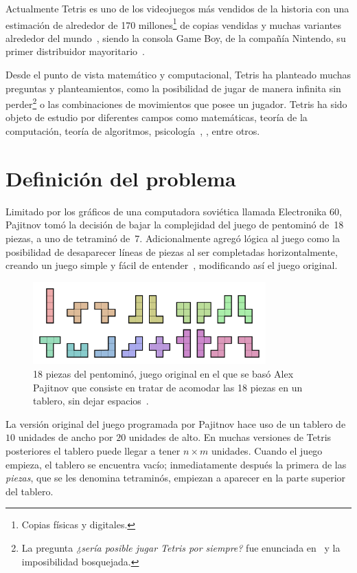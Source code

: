 Actualmente Tetris es uno de los videojuegos más vendidos de la historia con una
estimación de alrededor de 170 millones\footnote{Copias físicas y digitales.} de
copias vendidas y muchas variantes alrededor del mundo~\cite{tetris-numbers},
siendo la consola Game Boy, de la compañía Nintendo, su primer distribuidor
mayoritario~\cite{tetris-25-aniv}.

Desde el punto de vista matemático y computacional, Tetris ha planteado muchas
preguntas y planteamientos, como la posibilidad de jugar de manera infinita sin
perder\footnote{La pregunta \textit{¿sería posible jugar Tetris por siempre?}
fue enunciada en~\cite{Burgiel97howto} y la imposibilidad bosquejada.}
o las combinaciones de movimientos que posee un jugador. Tetris
ha sido objeto de estudio por diferentes campos como matemáticas, teoría de la
computación, teoría de algoritmos, psicología~\cite{Brzustowski_1992},
\cite{Burgiel97howto}, entre otros.

\section{Definición del problema}

Limitado por los gráficos de una computadora soviética llamada Electronika 60,
Pajitnov tomó la decisión de bajar la complejidad del juego de pentominó de~18
piezas, a uno de tetraminó de~7. Adicionalmente agregó lógica al juego como la
posibilidad de desaparecer líneas de piezas al ser completadas horizontalmente,
creando un juego simple y fácil de entender~\cite{tetris-history}, modificando
así el juego original.

\begin{figure}[h]
  \centering
      \includegraphics[width=0.8\textwidth]{./images/pentominoes}
    \caption{18 piezas del pentominó, juego original en el que se basó Alex
    Pajitnov que consiste en tratar de acomodar las 18 piezas en un
    tablero, sin dejar espacios~\cite{WikipediaEN:pentomino}.}
    \label{fig:Pentomino}
\end{figure}

La versión original del juego programada por Pajitnov hace uso de un tablero de
$10$ unidades de ancho por $20$ unidades de alto. En muchas versiones de Tetris
posteriores el tablero puede llegar a tener $n \times m$
unidades. Cuando el juego empieza, el tablero se encuentra vacío; inmediatamente
después la primera de las \textit{piezas}, que se les denomina tetraminós,
empiezan a aparecer en la parte superior del tablero.

